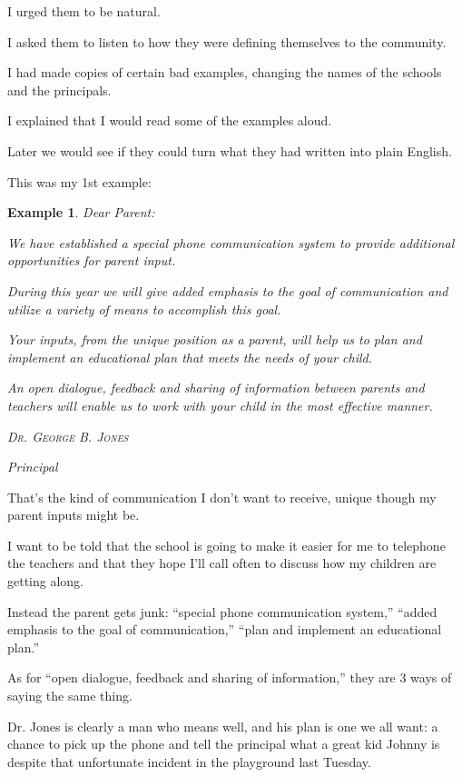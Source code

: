 \documentclass{book}
\numberwithin{equation}{section}
\newtheorem{example}{Example}[chapter]
\begin{document}
I urged them to be natural.


%
I asked them to listen to how they were defining themselves to the community.

I had made copies of certain bad examples, changing the names of the schools and the principals.

I explained that I would read some of the examples aloud.

Later we would see if they could turn what they had written into plain English.

This was my 1st example:
\begin{example}
    Dear Parent:
    
    We have established a special phone communication system to provide additional opportunities for parent input.
    
    During this year we will give added emphasis to the goal of communication and utilize a variety of means to accomplish this goal.
    
    Your inputs, from the unique position as a parent, will help us to plan and implement an educational plan that meets the needs of your child.
    
    An open dialogue, feedback and sharing of information between parents and teachers will enable us to work with your child in the most effective manner.
    
    \begin{flushright}
        \textsc{Dr. George B. Jones}
        
        Principal
    \end{flushright}
\end{example}
That's the kind of communication I don't want to receive, unique though my parent inputs might be.

I want to be told that the school is going to make it easier for me to telephone the teachers and that they hope I'll call often to discuss how my children are getting along.

Instead the parent gets junk: ``special phone communication system,'' ``added emphasis to the goal of communication,'' ``plan and implement an educational plan.''

As for ``open dialogue, feedback and sharing of information,'' they are 3 ways of saying the same thing.

%
Dr. Jones is clearly a man who means well, and his plan is one we all want: a chance to pick up the phone and tell the principal what a great kid Johnny is despite that unfortunate incident in the playground last Tuesday.
\end{document}
